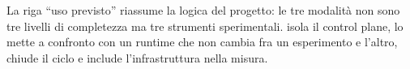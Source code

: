 La riga ``uso previsto'' riassume la logica del progetto: le tre modalit\`a non
sono tre livelli di completezza ma tre strumenti sperimentali. 
isola il control plane,  lo mette a confronto con un runtime che
non cambia fra un esperimento e l'altro,  chiude il ciclo e
include l'infrastruttura nella misura.
